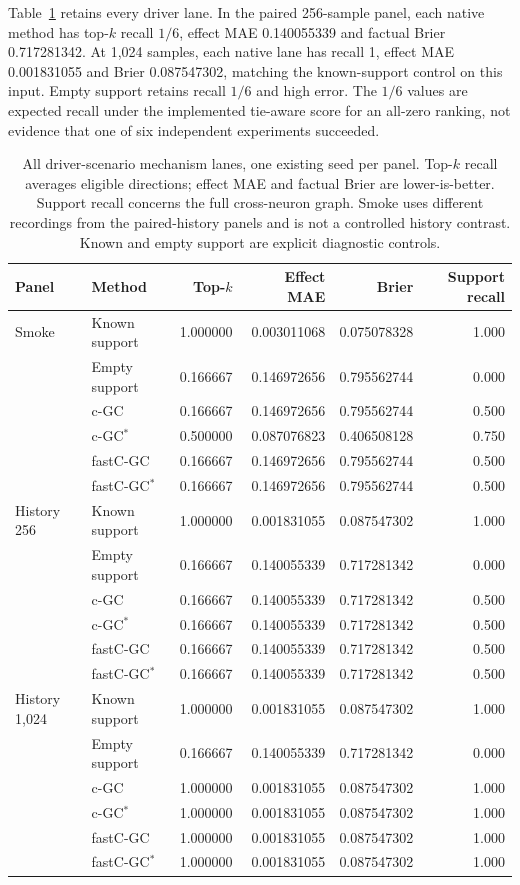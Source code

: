 \documentclass[11pt,a4paper]{article}
\newcommand{\cgc}{c-GC}
\newcommand{\cgcs}{c-GC$^{*}$}
\newcommand{\fastcgc}{fastC-GC}
\newcommand{\fastcgcs}{fastC-GC$^{*}$}
\begin{document}
Table~\ref{tab:mechanism} retains every driver lane. In the paired 256-sample panel,
each native method has top-$k$ recall $1/6$, effect MAE 0.140055339 and factual Brier
0.717281342. At 1,024 samples, each native lane has recall 1, effect MAE 0.001831055
and Brier 0.087547302, matching the known-support control on this input. Empty
support retains recall $1/6$ and high error. The $1/6$ values are expected recall
under the implemented tie-aware score for an all-zero ranking, not evidence that
one of six independent experiments succeeded.

\begin{table}[htbp]
\centering
\small
\setlength{\tabcolsep}{4pt}
\caption{All driver-scenario mechanism lanes, one existing seed per panel.
Top-$k$ recall averages eligible directions; effect MAE and factual Brier are
lower-is-better. Support recall concerns the full cross-neuron graph. Smoke uses
different recordings from the paired-history panels and is not a controlled
history contrast. Known and empty support are explicit diagnostic controls.}
\label{tab:mechanism}
\begin{tabular}{@{}llrrrr@{}}
\toprule
Panel & Method & Top-$k$ & Effect MAE & Brier & Support recall \\
\midrule
Smoke & Known support & 1.000000 & 0.003011068 & 0.075078328 & 1.000 \\
 & Empty support & 0.166667 & 0.146972656 & 0.795562744 & 0.000 \\
 & \cgc & 0.166667 & 0.146972656 & 0.795562744 & 0.500 \\
 & \cgcs & 0.500000 & 0.087076823 & 0.406508128 & 0.750 \\
 & \fastcgc & 0.166667 & 0.146972656 & 0.795562744 & 0.500 \\
 & \fastcgcs & 0.166667 & 0.146972656 & 0.795562744 & 0.500 \\
\midrule
History 256 & Known support & 1.000000 & 0.001831055 & 0.087547302 & 1.000 \\
 & Empty support & 0.166667 & 0.140055339 & 0.717281342 & 0.000 \\
 & \cgc & 0.166667 & 0.140055339 & 0.717281342 & 0.500 \\
 & \cgcs & 0.166667 & 0.140055339 & 0.717281342 & 0.500 \\
 & \fastcgc & 0.166667 & 0.140055339 & 0.717281342 & 0.500 \\
 & \fastcgcs & 0.166667 & 0.140055339 & 0.717281342 & 0.500 \\
\midrule
History 1,024 & Known support & 1.000000 & 0.001831055 & 0.087547302 & 1.000 \\
 & Empty support & 0.166667 & 0.140055339 & 0.717281342 & 0.000 \\
 & \cgc & 1.000000 & 0.001831055 & 0.087547302 & 1.000 \\
 & \cgcs & 1.000000 & 0.001831055 & 0.087547302 & 1.000 \\
 & \fastcgc & 1.000000 & 0.001831055 & 0.087547302 & 1.000 \\
 & \fastcgcs & 1.000000 & 0.001831055 & 0.087547302 & 1.000 \\
\bottomrule
\end{tabular}
\end{table}
\end{document}
